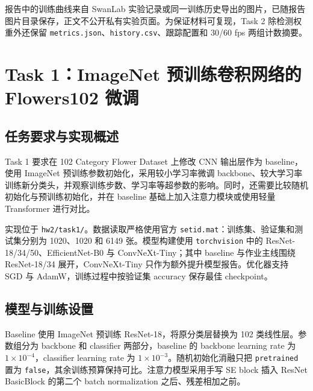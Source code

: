 \documentclass[lang=cn,a4paper,newtx,code=minted]{elegantpaper}
\begin{document}
报告中的训练曲线来自 SwanLab 实验记录或同一训练历史导出的图片，已随报告图片目录保存，正文不公开私有实验页面。为保证材料可复现，Task 2 除检测权重外还保留 \texttt{metrics.json}、\texttt{history.csv}、跟踪配置和 30/60 fps 两组计数摘要。

\section{Task 1：ImageNet 预训练卷积网络的 Flowers102 微调}

\subsection{任务要求与实现概述}

Task 1 要求在 102 Category Flower Dataset 上修改 CNN 输出层作为 baseline，使用 ImageNet 预训练参数初始化，采用较小学习率微调 backbone、较大学习率训练新分类头，并观察训练步数、学习率等超参数的影响。同时，还需要比较随机初始化与预训练初始化，并在 baseline 基础上加入注意力模块或使用轻量 Transformer 进行对比。

实现位于 \texttt{hw2/task1/}。数据读取严格使用官方 \texttt{setid.mat}：训练集、验证集和测试集分别为 1020、1020 和 6149 张。模型构建使用 \texttt{torchvision} 中的 ResNet-18/34/50、EfficientNet-B0 与 ConvNeXt-Tiny；其中 baseline 与作业主线围绕 ResNet-18/34 展开，ConvNeXt-Tiny 只作为额外提升模型报告。优化器支持 SGD 与 AdamW，训练过程中按验证集 accuracy 保存最佳 checkpoint。

\subsection{模型与训练设置}

Baseline 使用 ImageNet 预训练 ResNet-18，将原分类层替换为 102 类线性层。参数组分为 backbone 和 classifier 两部分，baseline 的 backbone learning rate 为 $1\times10^{-4}$，classifier learning rate 为 $1\times10^{-3}$。随机初始化消融只把 \texttt{pretrained} 置为 \texttt{false}，其余训练预算保持可比。注意力模型采用手写 SE block 插入 ResNet BasicBlock 的第二个 batch normalization 之后、残差相加之前。
\end{document}
